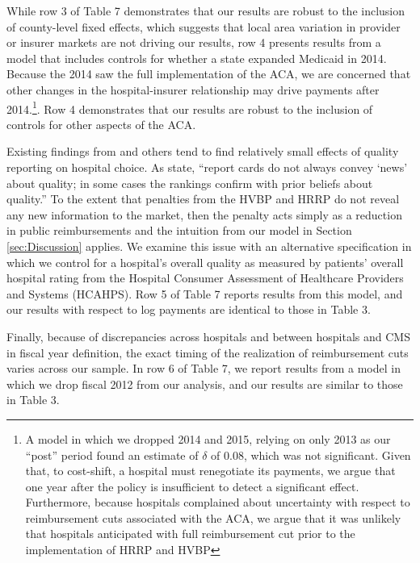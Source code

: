 \documentclass[12pt]{article}
\begin{document}
 While row 3 of Table 7 demonstrates that our results are robust to the inclusion of county-level fixed effects, which suggests that local area variation in provider or insurer markets are not driving our results, row 4 presents results from a model that includes controls for whether a state expanded Medicaid in 2014.  Because the 2014 saw the full implementation of the ACA, we are concerned that other changes in the hospital-insurer relationship may drive payments after 2014.\footnote{A model in which we dropped 2014 and 2015, relying on only 2013 as our ``post'' period found an estimate of $\delta$ of 0.08, which was not significant.  Given that, to cost-shift, a hospital must renegotiate its payments, we argue that one year after the policy is insufficient to detect a significant effect.  Furthermore, because hospitals complained about uncertainty with respect to reimbursement cuts associated with the ACA, we argue that it was unlikely that hospitals anticipated with full reimbursement cut prior to the implementation of HRRP and HVBP}.  Row 4 demonstrates that our results are robust to the inclusion of controls for other aspects of the ACA.     

Existing findings from \cite{dranove2008} and others tend to find relatively small effects of quality reporting on hospital choice. As \cite{dranove2008} state, ``report cards do not always convey `news' about quality; in some cases the rankings confirm with prior beliefs about quality.'' To the extent that penalties from the HVBP and HRRP do not reveal any new information to the market, then the penalty acts simply as a reduction in public reimbursements and the intuition from our model in Section \ref{sec:Discussion} applies. We examine this issue with an alternative specification in which we control for a hospital's overall quality as measured by patients' overall hospital rating from the Hospital Consumer Assessment of Healthcare Providers and Systems (HCAHPS).  Row 5 of Table 7 reports results from this model, and our results with respect to log payments are identical to those in Table 3.  

Finally, because of discrepancies across hospitals and between hospitals and CMS in fiscal year definition, the exact timing of the realization of reimbursement cuts varies across our sample. In row 6 of Table 7, we report results from a model in which we drop fiscal 2012 from our analysis, and our results are similar to those in Table 3. 
\end{document}
